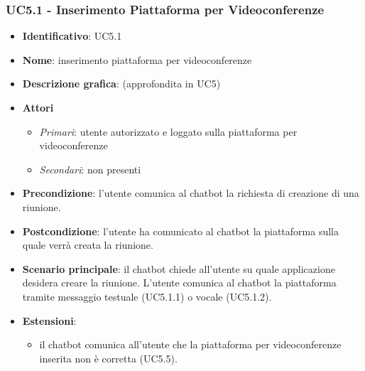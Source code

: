 \subsubsection{UC5.1 - Inserimento Piattaforma per Videoconferenze}
\begin{itemize}
    \item \textbf{Identificativo}: UC5.1
    \item \textbf{Nome}: inserimento piattaforma per videoconferenze
    \item \textbf{Descrizione grafica}: (approfondita in UC5)
    \item \textbf{Attori}
 \begin{itemize} 
    \item \textit{Primari}: utente autorizzato e loggato sulla piattaforma per videoconferenze
    \item \textit{Secondari}: non presenti
 \end{itemize}
 \item \textbf{Precondizione}: l'utente comunica al chatbot la richiesta di creazione di una riunione.
 \item \textbf{Postcondizione}: l'utente ha comunicato al chatbot la piattaforma sulla quale verrà creata la riunione.
 \item \textbf{Scenario principale}: il chatbot chiede all'utente su quale applicazione desidera creare la riunione. L'utente comunica al chatbot la piattaforma tramite messaggio testuale (UC5.1.1) o vocale (UC5.1.2).
 \item \textbf{Estensioni}: 
 \begin{itemize} 
    \item il chatbot comunica all'utente che la piattaforma per videoconferenze inserita non è corretta (UC5.5).
 \end{itemize}
\end{itemize}

